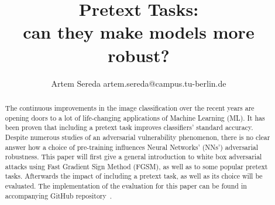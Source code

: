 \documentclass[12pt]{extarticle}
\title{
    Pretext Tasks: \\
    can they make models more robust?
}
\author{Artem Sereda artem.sereda@campus.tu-berlin.de}
\begin{document}
    \maketitle

    \begin{abstract}
    The continuous improvements in the image classification over the recent years are opening doors to
    a lot of life-changing applications of Machine Learning (ML).
    It has been proven that including a pretext task improves classifiers' standard accuracy.
    Despite numerous studies of an adversarial vulnerability phenomenon, there is no clear answer
    how a choice of pre-training influences Neural Networks' (NNs') adversarial robustness.
    This paper will first give a general introduction to white box adversarial attacks using Fast Gradient Sign Method (FGSM),
    as well as to some popular pretext tasks.
    Afterwards the impact of including a pretext task, as well as its choice will be evaluated.
    The implementation of the evaluation for this paper can be found in accompanying GitHub repository~\cite{github}.
    \end{abstract}


    
    
    
    


    \printbibliography
\end{document}
